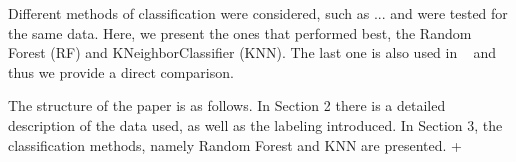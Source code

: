 Different methods of classification were considered, such as ... and were tested for the same data. Here, we present the ones that performed best, the Random Forest (RF) and KNeighborClassifier (KNN). The last one is also used in ~\cite{Chatterjee:2019avs} and thus we provide a direct comparison. 

The structure of the paper is as follows. In Section 2 there is a detailed description of the data used, as well as the labeling introduced. In Section 3, the classification methods, namely Random Forest and KNN are presented. +   
